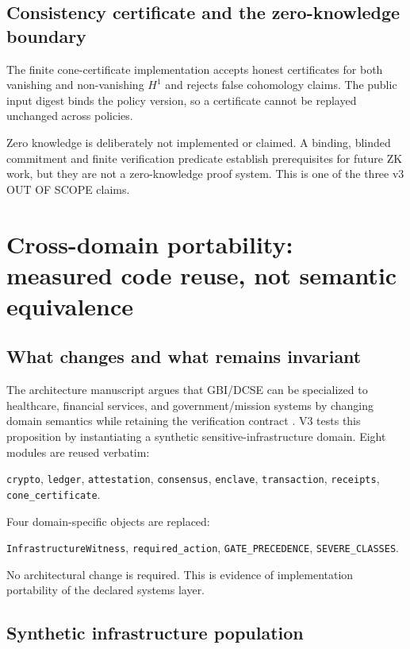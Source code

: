 \documentclass[11pt]{article}
\newcommand{\code}[1]{\texttt{#1}}
\begin{document}
\subsection{Consistency certificate and the zero-knowledge boundary}

The finite cone-certificate implementation accepts honest certificates for both vanishing and non-vanishing \(H^1\) and rejects false cohomology claims. The public input digest binds the policy version, so a certificate cannot be replayed unchanged across policies.

Zero knowledge is deliberately not implemented or claimed. A binding, blinded commitment and finite verification predicate establish prerequisites for future ZK work, but they are not a zero-knowledge proof system. This is one of the three v3 OUT OF SCOPE claims.
\newpage

\section{Cross-domain portability: measured code reuse, not semantic equivalence}

\subsection{What changes and what remains invariant}

The architecture manuscript argues that GBI/DCSE can be specialized to healthcare, financial services, and government/mission systems by changing domain semantics while retaining the verification contract \cite{spivey2026gbi}. V3 tests this proposition by instantiating a synthetic sensitive-infrastructure domain.
Eight modules are reused verbatim:
\begin{center}
\code{crypto}, \code{ledger}, \code{attestation}, \code{consensus}, \code{enclave}, \code{transaction}, \code{receipts}, \code{cone\_certificate}.
\end{center}
Four domain-specific objects are replaced:
\begin{center}
\code{InfrastructureWitness}, \code{required\_action}, \code{GATE\_PRECEDENCE}, \code{SEVERE\_CLASSES}.
\end{center}
No architectural change is required. This is evidence of implementation portability of the declared systems layer.

\subsection{Synthetic infrastructure population}
\end{document}
